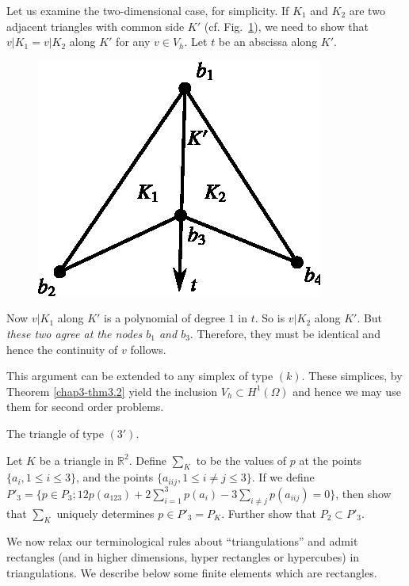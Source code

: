 Let us examine the two-dimensional case, for simplicity. If $K_{1}$
and $K_{2}$ are two adjacent triangles with common side $K'$
(cf. Fig.~\ref{chap4-fig4.3}), we need to show that $v|K_{1}=v|K_{2}$
along $K'$ for any $v\in V_{h}$. Let $t$ be an abscissa along $K'$.
\begin{figure}[H]
\centering
\includegraphics{figure/fig4.3.eps}
\caption{}\label{chap4-fig4.3}
\end{figure}\pageoriginale 

Now $v|K_{1}$ along $K'$ is a polynomial of degree $1$ in $t$. So is
$v|K_{2}$ along $K'$. But {\em these two agree at the nodes $b_{1}$
  and $b_{3}$}. Therefore, they must be identical and hence the
continuity of $v$ follows.

This argument can be extended to any simplex of type $(k)$. These
simplices, by Theorem \ref{chap3-thm3.2} yield the inclusion
$V_{h}\subset H^{1}(\Omega)$ and hence we may use them for second
order problems.

\begin{exercise}\label{chap4-exer4.2}
The triangle of type $(3')$.

Let $K$ be a triangle in $\mathbb{R}^{2}$. Define $\sum_{K}$ to be the
values of $p$ at the points $\{a_{i},1\leq i\leq 3\}$, and the points
$\{a_{iij},1\leq i\neq j\leq 3\}$. If we define $P'_{3}=\{p\in P_{3};
12p(a_{123})+2\sum^{3}_{i=1}p(a_{i})-3\sum_{i\neq j}p(a_{iij})=0\}$,
then show that $\sum_{K}$ uniquely determines $p\in
P'_{3}=P_{K}$. Further show that $P_{2}\subset P'_{3}$.
\end{exercise}

We now relax our terminological rules about ``triangulations'' and
admit rectangles (and in higher dimensions, hyper rectangles or
hypercubes) in triangulations. We describe below some finite elements
which are rectangles.

